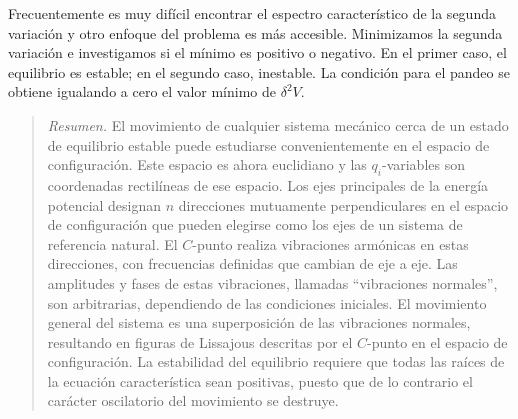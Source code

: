 \documentclass[12pt,a4paper]{book}
\begin{document}
Frecuentemente es muy difícil encontrar el espectro característico de la segunda variación y otro enfoque del problema es más accesible. Minimizamos la segunda variación e investigamos si el mínimo es positivo o negativo. En el primer caso, el equilibrio es estable; en el segundo caso, inestable. La condición para el pandeo se obtiene igualando a cero el valor mínimo de $\delta^2 V$.


\begin{quote}
\textit{Resumen.} El movimiento de cualquier sistema mecánico cerca de un estado de equilibrio estable puede estudiarse convenientemente en el espacio de configuración. Este espacio es ahora euclidiano y las $q_i$-variables son coordenadas rectilíneas de ese espacio. Los ejes principales de la energía potencial designan $n$ direcciones mutuamente perpendiculares en el espacio de configuración que pueden elegirse como los ejes de un sistema de referencia natural. El $C$-punto realiza vibraciones armónicas en estas direcciones, con frecuencias definidas que cambian de eje a eje. Las amplitudes y fases de estas vibraciones, llamadas ``vibraciones normales'', son arbitrarias, dependiendo de las condiciones iniciales. El movimiento general del sistema es una superposición de las vibraciones normales, resultando en figuras de Lissajous descritas por el $C$-punto en el espacio de configuración. La estabilidad del equilibrio requiere que todas las raíces de la ecuación característica sean positivas, puesto que de lo contrario el carácter oscilatorio del movimiento se destruye.
\end{quote}
\end{document}
